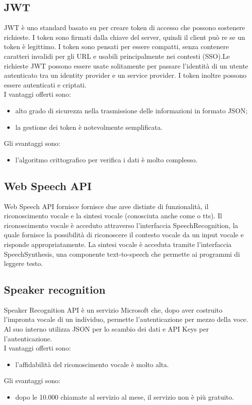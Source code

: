 \subsection{JWT}
JWT è uno standard basato su  per creare token di accesso che possono sostenere richieste. I token sono firmati dalla chiave del server, quindi il client può re se un token è legittimo. I token sono pensati per essere compatti, senza contenere caratteri invalidi per gli URL e usabili principalmente nei contesti  (SSO).Le richieste JWT possono essere usate solitamente per passare l'identità di un utente autenticato tra un identity provider e un service provider. I token inoltre possono essere autenticati e criptati.\\
I vantaggi offerti sono:
\begin{itemize}
	\item alto grado di sicurezza nella trasmissione delle informazioni in formato JSON;
	\item la gestione dei token è notevolmente semplificata.
\end{itemize}
Gli svantaggi sono:
\begin{itemize}
	\item l'algoritmo crittografico per verifica i dati è molto complesso.
\end{itemize}
\subsection{Web Speech API}
Web Speech API fornisce fornisce due aree distinte di funzionalità, il riconoscimento vocale e la sintesi vocale (conosciuta anche come  o tts).
Il riconoscimento vocale è acceduto attraverso l'interfaccia SpeechRecognition, la quale fornisce la possibilità di riconoscere il contesto vocale da un input vocale e risponde appropriatamente.
La sintesi vocale è acceduta tramite l'interfaccia SpeechSynthesis, una componente text-to-speech che permette ai programmi di leggere testo.

\subsection{Speaker recognition}
Speaker Recognition API è un servizio Microsoft che, dopo aver costruito l'impronta vocale di un individuo, permette l'autenticazione per mezzo della voce. Al suo interno utilizza JSON per lo scambio dei dati e API Keys per l'autenticazione.
\\
I vantaggi offerti sono:
\begin{itemize}
	\item l'affidabilità del riconoscimento vocale è molto alta.
\end{itemize}
Gli svantaggi sono:
\begin{itemize}
	\item dopo le 10.000 chiamate al servizio al mese, il servizio non è più gratuito.
\end{itemize}
